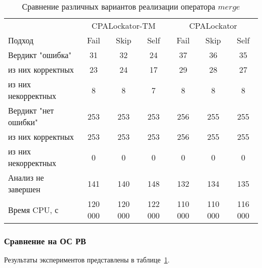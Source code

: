 \begin{center}
  \begin{table}[h]\footnotesize \centering
  	\label{table-drivers-thread-create}
    \caption{Сравнение различных вариантов реализации оператора $merge$}
    \begin{tabular}{ | l | c | c | c | c | c | c |}
      \hline
      				& 		\multicolumn{3}{|c|}{CPALockator-TM} 		& \multicolumn{3}{|c|}{CPALockator} \\
      Подход         				& Fail 		& Skip 		& Self 		& Fail 	& Skip 		& Self  \\ \hline
      Вердикт "ошибка" 				& 31   		& 32   		& 24   		& 37   	& 36   		& 35   \\ 
  \hspace{0.5cm} из них корректных 	& 23 		& 24 		& 17   		& 29   	& 28   		& 27   \\ 
  \hspace{0.5cm} из них некорректных & 8 		& 8 		& 7   		& 8   	& 8   		& 8   \\ \hline
      Вердикт "нет ошибки"  		& 253    	& 253    	& 253   	& 256   & 255  		& 255   \\ 
  \hspace{0.5cm} из них корректных 	& 253 		& 253    	& 253   	& 256   & 255   	& 255   \\
  \hspace{0.5cm} из них некорректных & 0 		& 0    		& 0     	& 0   	& 0   		& 0   \\ \hline
      Анализ не завершен       		& 141    	& 140    	& 148    	& 132   & 134   	& 135   \\ \hline
      Время CPU, с   				& 120 000 	& 120 000 	& 122 000 	& 110 000 & 110 000 & 116 000   \\ 
      \hline
    \end{tabular}
  \end{table}
\end{center}


\subsubsection{Сравнение на ОС РВ}
Результаты экспериментов представлены в таблице~\ref{table-drivers-thread-create}.

